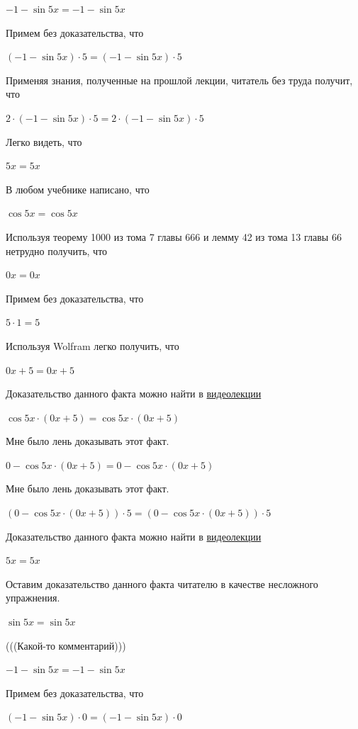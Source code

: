 \documentclass[12pt,a4paper,fleqn]{article}
\theoremstyle{definition}
\begin{document}
$ -1  - \sin 5  x  =  -1  - \sin 5  x $

Примем без доказательства, что 

$( -1  - \sin 5  x ) \cdot  5  = ( -1  - \sin 5  x ) \cdot  5 $

Применяя знания, полученные на прошлой лекции, читатель без труда получит, что 

$ 2  \cdot ( -1  - \sin 5  x ) \cdot  5  =  2  \cdot ( -1  - \sin 5  x ) \cdot  5 $

Легко видеть, что 

$ 5  x  =  5  x $

В любом учебнике написано, что 

$\cos 5  x  = \cos 5  x $

Используя теорему 1000 из тома 7 главы 666 и лемму 42 из тома 13 главы 66 нетрудно получить, что 

$ 0  x  =  0  x $

Примем без доказательства, что 

$ 5  \cdot  1  =  5 $

Используя Wolfram легко получить, что 

$ 0  x  +  5  =  0  x  +  5 $

Доказательство данного факта можно найти в \href{https://www.youtube.com/watch?v=dQw4w9WgXcQ}{видеолекции} 

$\cos 5  x  \cdot ( 0  x  +  5 ) = \cos 5  x  \cdot ( 0  x  +  5 )$

Мне было лень доказывать этот факт.

$ 0  - \cos 5  x  \cdot ( 0  x  +  5 ) =  0  - \cos 5  x  \cdot ( 0  x  +  5 )$

Мне было лень доказывать этот факт.

$( 0  - \cos 5  x  \cdot ( 0  x  +  5 )) \cdot  5  = ( 0  - \cos 5  x  \cdot ( 0  x  +  5 )) \cdot  5 $

Доказательство данного факта можно найти в \href{https://www.youtube.com/watch?v=dQw4w9WgXcQ}{видеолекции} 

$ 5  x  =  5  x $

Оставим доказательство данного факта читателю в качестве несложного упражнения. 

$\sin 5  x  = \sin 5  x $

(((Какой-то комментарий))) 

$ -1  - \sin 5  x  =  -1  - \sin 5  x $

Примем без доказательства, что 

$( -1  - \sin 5  x ) \cdot  0  = ( -1  - \sin 5  x ) \cdot  0 $
\end{document}
